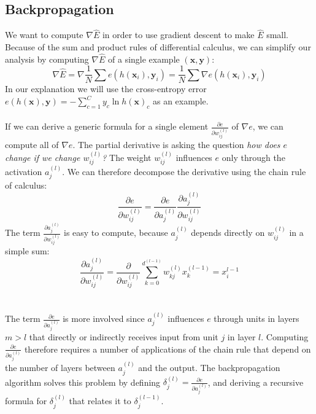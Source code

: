\subsection{Backpropagation}
We want to compute $\nabla\hat{E}$ in order to use gradient descent to make $\hat{E}$ small. Because of the sum and product rules of differential calculus, we can simplify our analysis by computing $\nabla\hat{E}$ of a single example $(\mathbf{x}, \mathbf{y})$:
$$
\nabla \hat{E} = \nabla \frac{1}{N}\sum e(h(\mathbf{x}_i), \mathbf{y}_i) = \frac{1}{N}\sum \nabla e(h(\mathbf{x}_i), \mathbf{y}_i)
$$
In our explanation we will use the cross-entropy error $e(h(\mathbf{x}), \mathbf{y}) = -\sum_{c=1}^Cy_c \ln h(\mathbf{x})_c$ as an example. 
\\\\
If we can derive a generic formula for a single element $\frac{\partial e}{\partial w^{(l)}_{ij}}$ of $\nabla e$, we can compute all of $\nabla e$. The partial derivative is asking the question \textit{how does $e$ change if we change $w^{(l)}_{ij}$?} The weight $w^{(l)}_{ij}$ influences $e$ only through the activation $a^{(l)}_{j}$. We can therefore decompose the derivative using the chain rule of calculus:
$$
\frac{\partial e}{\partial w^{(l)}_{ij}} = \frac{\partial e}{\partial a^{(l)}_j} \frac{\partial a^{(l)}_j}{\partial w^{(l)}_{ij}}
$$
The term $\frac{\partial a^{(l)}_j}{\partial w^{(l)}_{ij}}$ is easy to compute, because $a^{(l)}_{j}$ depends directly on $w^{(l)}_{ij}$ in a simple sum:
$$
\frac{\partial a^{(l)}_j}{\partial w^{(l)}_{ij}} = \frac{\partial}{\partial w^{(l)}_{ij}} \sum\limits_{k=0}^{d^{(l-1)}} w^{(l)}_{kj} x^{(l-1)}_{k} = x^{l-1}_{i}
$$
\\\\
The term $\frac{\partial e}{\partial a^{(l)}_j}$ is more involved since $a^{(l)}_j$ influences $e$ through units in layers $m > l$ that directly or indirectly receives input from unit $j$ in layer $l$. Computing $\frac{\partial e}{\partial a^{(l)}_j}$ therefore requires a number of applications of the chain rule that depend on the number of layers between $a^{(l)}_j$ and the output. The backpropagation algorithm solves this problem by defining $\delta^{(l)}_j = \frac{\partial e}{\partial a^{(l)}_j}$, and deriving a recursive formula for $\delta^{(l)}_{j}$ that relates it to $\delta^{(l-1)}_j$.

